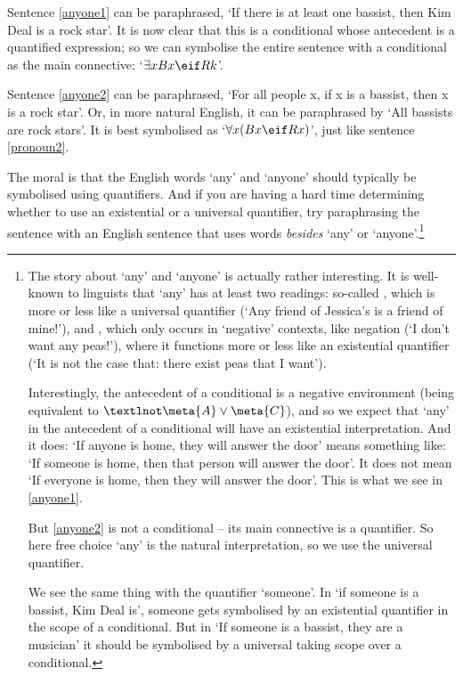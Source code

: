 Sentence \ref{anyone1} can be paraphrased, `If there is at least one bassist, then Kim Deal is a rock star'. It is now clear that this is a conditional whose antecedent is a quantified expression; so we can symbolise the entire sentence with a conditional as the main connective: `$\exists x Bx \eif Rk$'. 

Sentence \ref{anyone2} can be paraphrased, `For all people x, if x is a bassist, then x is a rock star'. Or, in more natural English, it can be paraphrased by `All bassists are rock stars'. It is best symbolised as `$\forall x(Bx \eif Rx)$', just like sentence \ref{pronoun2}.

The moral is that the English words `any' and `anyone' should typically be symbolised using quantifiers. And if you are having a hard time determining whether to use an existential or a universal quantifier, try paraphrasing the sentence with an English sentence that uses words \emph{besides} `any' or `anyone'.\footnote{The story about `any' and `anyone' is actually rather interesting. It is well-known to linguists that `any' has at least two readings: so-called , which is more or less like a universal quantifier (`Any friend of Jessica's is a friend of mine!'), and , which only occurs in `negative' contexts, like negation (`I don't want any peas!'), where it functions more or less like an existential quantifier (`It is not the case that: there exist peas that I want'). 

		Interestingly, the antecedent of a conditional is a negative environment (being equivalent to $¬\meta{A}\vee\meta{C}$), and so we expect that `any' in the antecedent of a conditional will have an existential interpretation. And it does: `If anyone is home, they will answer the door' means something like: `If someone is home, then that person will answer the door'. It does not mean `If everyone is home, then they will answer the door'. This is what we see in \ref{anyone1}.

		But \ref{anyone2} is not a conditional – its main connective is a quantifier. So here free choice `any' is the natural interpretation, so we use the universal quantifier.

		We see the same thing with the quantifier `someone'. In `if someone is a bassist, Kim Deal is', someone gets symbolised by an existential quantifier in the scope of a conditional. But in `If someone is a bassist, they are a musician' it should be symbolised by a universal taking scope over a conditional.}




